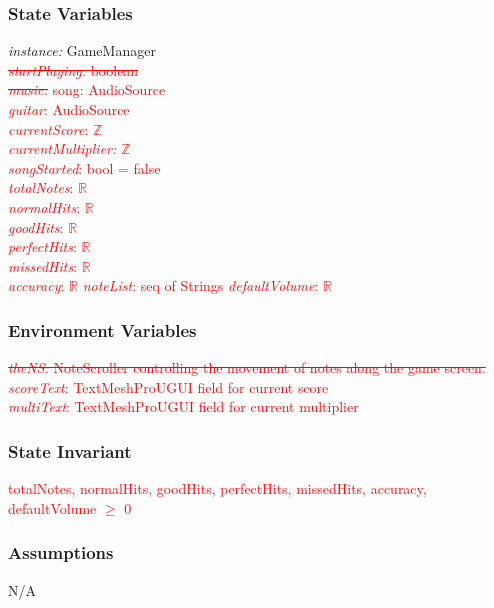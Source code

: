 \documentclass[12pt]{article}
\begin{document}
\subsubsection{State Variables}
\textit{instance:} GameManager\\
\textcolor{red}{\sout{\textit{startPlaying:} boolean}}\\
\textcolor{red}{\sout{\textit{music:}} song: AudioSource} \\
\textcolor{red}{\textit{guitar}: AudioSource}\\
\textcolor{red}{\textit{currentScore}: $\mathbb{Z}$}\\
\textcolor{red}{\textit{currentMultiplier: $\mathbb{Z}$}}\\
\textcolor{red}{\textit{songStarted}: bool = false}\\
\textcolor{red}{\textit{totalNotes}: $\mathbb{R}$}\\
\textcolor{red}{\textit{normalHits}: $\mathbb{R}$}\\
\textcolor{red}{\textit{goodHits}: $\mathbb{R}$}\\
\textcolor{red}{\textit{perfectHits}: $\mathbb{R}$}\\
\textcolor{red}{\textit{missedHits}: $\mathbb{R}$}\\
\textcolor{red}{\textit{accuracy}: $\mathbb{R}$}
\textcolor{red}{\textit{noteList}: seq of Strings}
\textcolor{red}{\textit{defaultVolume}: $\mathbb{R}$}

\subsubsection{Environment Variables}
\textcolor{red}{\sout{\textit{theNS:} NoteScroller controlling the movement of notes along the game screen.}}\\
\textcolor{red}{\textit{scoreText}: TextMeshProUGUI field for current score}\\
\textcolor{red}{\textit{multiText}: TextMeshProUGUI field for current multiplier}

\subsubsection{State Invariant}
\textcolor{red}{totalNotes, normalHits, goodHits, perfectHits, missedHits, accuracy, defaultVolume $\geq$ 0}

\subsubsection{Assumptions}
N/A
\end{document}
